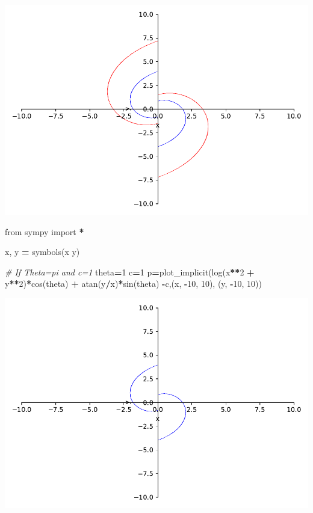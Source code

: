 \documentclass[
]{book}
\newenvironment{Shaded}{\begin{snugshade}}{\end{snugshade}}
\newcommand{\CommentTok}[1]{\textcolor[rgb]{0.56,0.35,0.01}{\textit{#1}}}
\newcommand{\DecValTok}[1]{\textcolor[rgb]{0.00,0.00,0.81}{#1}}
\newcommand{\ImportTok}[1]{#1}
\newcommand{\NormalTok}[1]{#1}
\newcommand{\OperatorTok}[1]{\textcolor[rgb]{0.81,0.36,0.00}{\textbf{#1}}}
\newcommand{\StringTok}[1]{\textcolor[rgb]{0.31,0.60,0.02}{#1}}
\theoremstyle{definition}
\theoremstyle{definition}
\theoremstyle{definition}
\theoremstyle{definition}
\theoremstyle{remark}
\begin{document}
\includegraphics{ConformalMapping_files/figure-latex/unnamed-chunk-60-5.pdf}

\begin{Shaded}
\begin{Highlighting}[]
\ImportTok{from}\NormalTok{ sympy }\ImportTok{import} \OperatorTok{*}

\NormalTok{x, y }\OperatorTok{=}\NormalTok{ symbols(}\StringTok{\textquotesingle{}x y\textquotesingle{}}\NormalTok{)}

\CommentTok{\# If Theta=pi and c=1}
\NormalTok{theta}\OperatorTok{=}\DecValTok{1}
\NormalTok{c}\OperatorTok{=}\DecValTok{1}
\NormalTok{p}\OperatorTok{=}\NormalTok{plot\_implicit(log(x}\OperatorTok{**}\DecValTok{2} \OperatorTok{+}\NormalTok{ y}\OperatorTok{**}\DecValTok{2}\NormalTok{)}\OperatorTok{*}\NormalTok{cos(theta) }\OperatorTok{+}\NormalTok{ atan(y}\OperatorTok{/}\NormalTok{x)}\OperatorTok{*}\NormalTok{sin(theta) }\OperatorTok{{-}}\NormalTok{c,(x, }\OperatorTok{{-}}\DecValTok{10}\NormalTok{, }\DecValTok{10}\NormalTok{), (y, }\OperatorTok{{-}}\DecValTok{10}\NormalTok{, }\DecValTok{10}\NormalTok{))}
\end{Highlighting}
\end{Shaded}

\includegraphics{ConformalMapping_files/figure-latex/unnamed-chunk-61-7.pdf}
\end{document}
